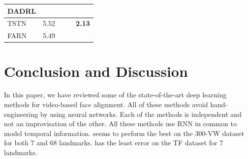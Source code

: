 \documentclass{llncs}
\begin{document}
\begin{table}[]
\begin{tabular}{|l|l|l|l|l|}
DADRL\cite{dadrl}                   &                                                                        &                                                                       &                                                                        &                                                                       \\ \hline
TSTN\cite{tstn}                    & 5.52                                                                   &                                                                       &                                                                        & \textbf{2.13}                                                         \\ \hline
FARN\cite{farn}                    & 5.49                                                                   &                                                                       &                                                                        &                                                                       \\ \hline
\end{tabular}
\label{comparison}
\end{table}



\section{Conclusion and Discussion}

In this paper, we have reviewed some of the state-of-the-art deep learning methods for video-based face alignment. All of these methods avoid hand-engineering by using neural networks. Each of the methods is independent and not an improvisation of the other. All these methods use RNN in common to model temporal information. \cite{rednet} seems to perform the best on the 300-VW dataset for both 7 and 68 landmarks. \cite{tstn} has the least error on the TF dataset for 7 landmarks. 

%

%
%


%
\end{document}
